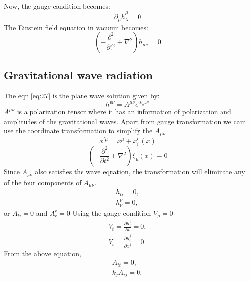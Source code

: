 \documentclass{ttuthes2007}
\begin{document}
Now, the gauge condition becomes:
\begin{equation}\label{eq:28}
\partial _\mu \tilde h^\mu _\lambda = 0
\end{equation}
The Einstein field equation in vacuum becomes:
\begin{equation}\label{eq:29}
\left(-\frac{\partial^2}{\partial t^2}+\nabla ^2\right)\tilde h_{\mu\nu} =0
\end{equation}


\subsection{Gravitational wave radiation}
The eqn \ref{eq:27} is the plane wave solution given by:
\begin{equation} \label{eq:30}
h^{\mu \nu} = A^{\mu \nu}e^{ik_\sigma x^\sigma}
\end{equation}
$A^{\mu \nu}$ is a polarization tensor where it has an information of
polarization and amplitudes of the gravitational waves.  Apart from gauge
transformation we cam use the coordinate transformation to simplify the $A_{\mu
\nu}$
\begin{equation}
x^{'\mu}= x^\mu +x_i ^\mu(x)
\end{equation}
\begin{equation}
\left(-\frac{\partial^2}{\partial t^2}+\nabla ^2\right)\xi_\mu(x) =0
\end{equation}
Since $A_{\mu \nu}$ also satisfies the wave equation, the transformation will
eliminate any of the four components of $A_{\mu \nu}$.
\begin{equation}
\begin{aligned}
h_{ti}=0, \\
h^\nu_\nu =0,
\end{aligned}
\end{equation}
or $A_{ti}=0$ and $A_\nu ^\nu=0$
Using the gauge condition $V_\mu =0$
\begin{equation}
\begin{aligned}
V_t=\frac{\partial h^t _t}{\partial t}=0,\\
V_i=\frac{\partial h^j _i}{\partial x^j}=0
\end{aligned}
\end{equation}
From the above equation,
\begin{equation}                                                                
\begin{aligned} 
A_{tt}=0, \\
k_j A_{ij}=0,
\end{aligned}                                                                   
\end{equation} 
\end{document}
